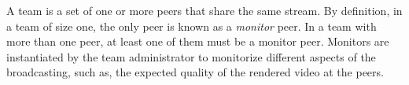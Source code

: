 
\label{sec:team_def}

A team is a set of one or more peers that share the same stream. By
definition, in a team of size one, the only peer is known as a
\emph{monitor} peer. In a team with more than one peer, at least one
of them must be a monitor peer. Monitors are instantiated by the team
administrator to monitorize different aspects of the broadcasting,
such as, the expected quality of the rendered video at the peers.
